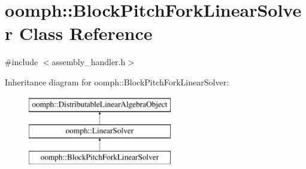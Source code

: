 \hypertarget{classoomph_1_1BlockPitchForkLinearSolver}{}\section{oomph\+:\+:Block\+Pitch\+Fork\+Linear\+Solver Class Reference}
\label{classoomph_1_1BlockPitchForkLinearSolver}


{\ttfamily \#include $<$assembly\+\_\+handler.\+h$>$}

Inheritance diagram for oomph\+:\+:Block\+Pitch\+Fork\+Linear\+Solver\+:\begin{figure}[H]
\begin{center}
\leavevmode
\includegraphics[height=3.000000cm]{classoomph_1_1BlockPitchForkLinearSolver}
\end{center}
\end{figure}
